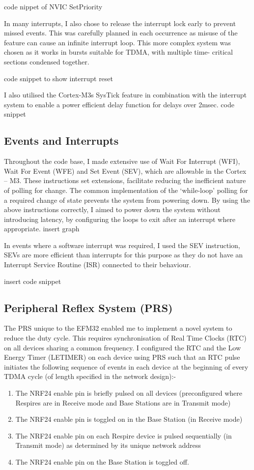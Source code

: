 {code nippet of NVIC SetPriority}

In many interrupts, I also chose to release the interrupt lock early to prevent missed events. This was
carefully planned in each occurrence as misuse of the feature can cause an infinite interrupt loop.
This more complex system was chosen as it works in bursts suitable for TDMA, with multiple time-
critical sections condensed together.


{code snippet to show interrupt reset}


I also utilised the Cortex-M3s SysTick feature in combination with the interrupt system to enable a
power efficient delay function for delays over 2msec.
{code snippet}


\subsection{Events and Interrupts}
Throughout the code base, I made extensive use of Wait For Interrupt (WFI), Wait For Event (WFE)
and Set Event (SEV), which are allowable in the Cortex – M3. These instructions set extensions,
facilitate reducing the inefficient nature of polling for change. The common implementation of the
‘while-loop’ polling for a required change of state prevents the system from powering down. By
using the above instructions correctly, I aimed to power down the system without introducing
latency, by configuring the loops to exit after an interrupt where appropriate.
{insert graph}


In events where a software interrupt was required, I used the SEV instruction, SEVs are more
efficient than interrupts for this purpose as they do not have an Interrupt Service Routine (ISR)
connected to their behaviour.


{insert code snippet}


\subsection{Peripheral Reflex System (PRS)}
The PRS unique to the EFM32 enabled me to implement a novel system to reduce the duty cycle.
This requires synchronisation of Real Time Clocks (RTC) on all devices sharing a common frequency. I
configured the RTC and the Low Energy Timer (LETIMER) on each device using PRS such that an RTC
pulse initiates the following sequence of events in each device at the beginning of every TDMA cycle
(of length specified in the network design):-
\begin{enumerate}
  \item The NRF24 enable pin is briefly pulsed on all devices (preconfigured where Respires are in
        Receive mode and Base Stations are in Transmit mode)
  \item The NRF24 enable pin is toggled on in the Base Station (in Receive mode)
  \item The NRF24 enable pin on each Respire device is pulsed sequentially (in Transmit mode) as
        determined by its unique network address
  \item The NRF24 enable pin on the Base Station is toggled off.
\end{enumerate}


